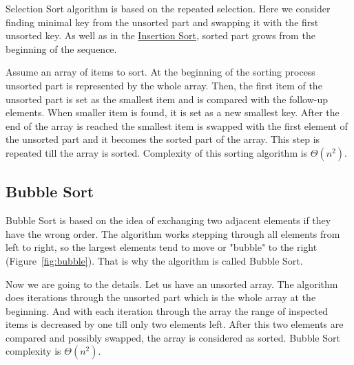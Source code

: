 \documentclass[
  field=inf,
  biblatex,
  language=english,
  glossaries,
  theorems=false,
  sourcecodes=false,
  index
]{kidiplom}
\begin{document}
Selection Sort algorithm is based on the repeated selection. Here we consider finding minimal key from the unsorted part and swapping it with the first unsorted key. As well as in the \hyperref[sec:insertion]{Insertion Sort}, sorted part grows from the beginning of the sequence.

Assume an array of items to sort. At the beginning of the sorting process unsorted part is represented by the whole array. Then, the first item of the unsorted part is set as the smallest item and is compared with the follow-up elements. When smaller item is found, it is set as a new smallest key. After the end of the array is reached the smallest item is swapped with the first element of the unsorted part and it becomes the sorted part of the array. This step is repeated till the array is sorted. Complexity of this sorting algorithm is $\Theta(n^2)$.

\subsection{Bubble Sort}
\label{sec:bubble}
Bubble Sort is based on the idea of exchanging two adjacent elements if they have the wrong order. The algorithm works stepping through all elements from left to right, so the largest elements tend to move or "bubble" to the right \mbox{(Figure \ref{fig:bubble})}. That is why the algorithm is called Bubble Sort.

Now we are going to the details. Let us have an unsorted array. The algorithm does iterations through the unsorted part which is the whole array at the beginning. And with each iteration through the array the range of inspected items is decreased by one till only two elements left. After this two elements are compared and possibly swapped, the array is considered as sorted. Bubble Sort complexity is $\Theta(n^2)$.
\end{document}
